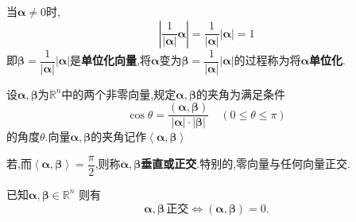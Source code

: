 \documentclass[9pt,a4paper]{book}
\begin{document}
\begin{defination}[单位化向量的定义]
	当$ \bm{\alpha}\neq 0$时,
	$$   \left|\dfrac{1}{|\bm{\alpha}|}\bm{\alpha} \right|=\frac{1}{|\bm{\alpha}|}|\bm{\alpha}|=1    $$
	即$ \bm{\beta}=\dfrac{1}{|\bm{\alpha}|}|\bm{\alpha}| $是\textbf{单位化向量},将$ \bm{\alpha} $变为$ \bm{\beta}=\dfrac{1}{|\bm{\alpha}|}|\bm{\alpha}| $的过程称为将$ \bm{\alpha} $\textbf{单位化}.
\end{defination}
\begin{defination}[向量的夹角]
	设$ \bm{\alpha},\bm{\beta}$为$\mathbb{R}^n $中的两个非零向量,规定$ \bm{\alpha},\bm{\beta} $的夹角为满足条件\[
	\cos\theta=\frac{(\bm{\alpha},\bm{\beta})}{|\bm{\alpha}|\cdot|\bm{\beta}|}\quad (0\leqslant\theta\leqslant\pi)
	\]
	的角度$ \theta $.向量$ \bm{\alpha},\bm{\beta} $的夹角记作$ \left\langle \bm{\alpha},\bm{\beta} \right\rangle  $
\end{defination}
\begin{defination}[向量正交的定义]
	若,而$ \left\langle \bm{\alpha},\bm{\beta} \right\rangle=\dfrac\pi2  $,则称$ \bm{\alpha},\bm{\beta} $\textbf{垂直或正交}.特别的,零向量与任何向量正交.
\end{defination}
\begin{feature}
	已知$ \bm{\alpha},\bm{\beta}\in\mathbb{R}^n $ 则有
	\[
	 \bm{\alpha},\bm{\beta} \,\mbox{正交}\Leftrightarrow (\bm{\alpha},\bm{\beta})=0
	.\]
\end{feature}
\end{document}

